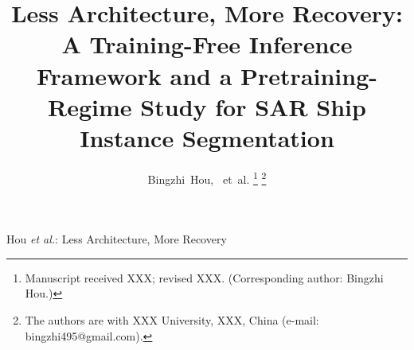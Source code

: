 \documentclass[journal]{IEEEtran}
\begin{document}
\title{Less Architecture, More Recovery: A Training-Free Inference Framework and a Pretraining-Regime Study for SAR Ship Instance Segmentation}

\author{Bingzhi~Hou,~ et~al.%
\thanks{Manuscript received XXX; revised XXX. (Corresponding author: Bingzhi Hou.)}%
\thanks{The authors are with XXX University, XXX, China (e-mail: bingzhi495@gmail.com).}}

%
{Hou \MakeLowercase{\textit{et al.}}: Less Architecture, More Recovery}

\maketitle









\end{document}
